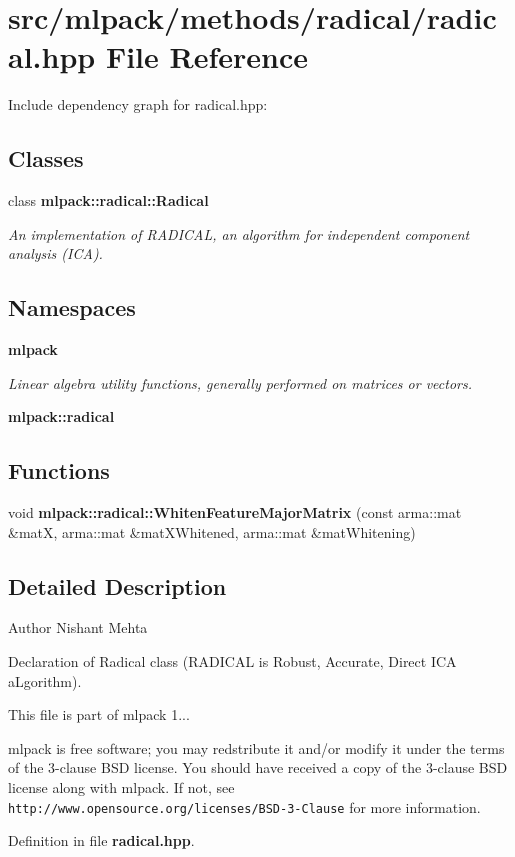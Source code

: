 \section{src/mlpack/methods/radical/radical.hpp File Reference}
\label{radical_8hpp}
Include dependency graph for radical.\-hpp\-:
\subsection*{Classes}
\begin{DoxyCompactItemize}
\item 
class {\bf mlpack\-::radical\-::\-Radical}
\begin{DoxyCompactList}\small\item\em An implementation of R\-A\-D\-I\-C\-A\-L, an algorithm for independent component analysis (I\-C\-A). \end{DoxyCompactList}\end{DoxyCompactItemize}
\subsection*{Namespaces}
\begin{DoxyCompactItemize}
\item 
{\bf mlpack}
\begin{DoxyCompactList}\small\item\em Linear algebra utility functions, generally performed on matrices or vectors. \end{DoxyCompactList}\item 
{\bf mlpack\-::radical}
\end{DoxyCompactItemize}
\subsection*{Functions}
\begin{DoxyCompactItemize}
\item 
void {\bf mlpack\-::radical\-::\-Whiten\-Feature\-Major\-Matrix} (const arma\-::mat \&mat\-X, arma\-::mat \&mat\-X\-Whitened, arma\-::mat \&mat\-Whitening)
\end{DoxyCompactItemize}


\subsection{Detailed Description}
\begin{DoxyAuthor}{Author}
Nishant Mehta
\end{DoxyAuthor}
Declaration of Radical class (R\-A\-D\-I\-C\-A\-L is Robust, Accurate, Direct I\-C\-A a\-Lgorithm).

This file is part of mlpack 1...

mlpack is free software; you may redstribute it and/or modify it under the terms of the 3-\/clause B\-S\-D license. You should have received a copy of the 3-\/clause B\-S\-D license along with mlpack. If not, see {\tt http\-://www.\-opensource.\-org/licenses/\-B\-S\-D-\/3-\/\-Clause} for more information. 

Definition in file {\bf radical.\-hpp}.

